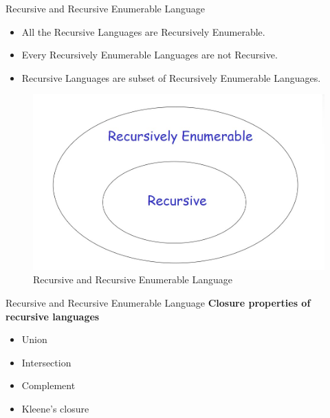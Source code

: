 \documentclass{beamer}
\begin{document}
\begin{frame}{Recursive and Recursive Enumerable Language}
\begin{itemize}
	\item All the Recursive Languages are
	Recursively Enumerable.
	
	\item Every Recursively Enumerable
	Languages are not Recursive.
	
	\item Recursive Languages are subset
	of Recursively Enumerable
	Languages.
\end{itemize}
		\begin{figure}
			\includegraphics[scale=.4]{img5/m30}
			\caption{Recursive and Recursive Enumerable Language}
		\end{figure}
\end{frame}
\begin{frame}{Recursive and Recursive Enumerable Language}
	\textbf{Closure properties of recursive languages }
	\begin{itemize}
		\item Union
		\item Intersection
		\item Complement
		\item Kleene's closure
	\end{itemize}
\end{frame}
\end{document}
